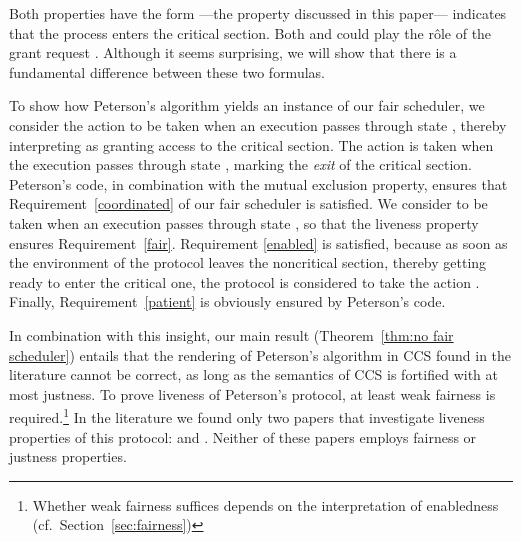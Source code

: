 \documentclass[smallcondensed]{svjour3}
\newcommand{\Thm}[1]{Theorem~\ref{thm:#1}}
\newcommand{\Sect}[1]{Section~\ref{sec:#1}}
\begin{document}
Both properties have the form ---the property discussed in this paper--- indicates that the process enters the critical section. Both  and  could 
play the r\^ole of the grant request .
Although it seems surprising, we will show that there is a fundamental difference between these two formulas.

To show how Peterson's algorithm yields an instance of our fair scheduler, we consider the
action  to be taken when an execution passes through state , thereby interpreting  as
granting access to the critical section. The action  is taken when the execution passes through state
, marking the \emph{exit} of the critical section. Peterson's code, in combination
with the mutual exclusion property, ensures that Requirement~\ref{coordinated} of our fair scheduler
is satisfied. We consider  to be taken when an execution passes through state , so that the
liveness property  ensures Requirement~\ref{fair}.
Requirement \ref{enabled} is satisfied, because as soon as the environment of the protocol leaves
the noncritical section, thereby getting ready to enter the critical one, the protocol is considered
to take the action . Finally, Requirement~\ref{patient} is obviously ensured by Peterson's code.

In combination with this insight, our main result (\Thm{no fair scheduler}) entails that
the rendering of Peterson's algorithm in CCS found in the literature cannot be correct, as long as the semantics of CCS
is fortified with at most justness.
To prove liveness of Peterson's protocol,
 at least weak fairness  is required.\footnote{Whether weak fairness suffices depends on the interpretation of enabledness (cf.\ \Sect{fairness})}
In the literature we found only two papers that investigate
liveness properties of this protocol:
\cite{Walker89} and \cite{Valmari96}. Neither of these papers employs fairness or justness properties.
\end{document}
